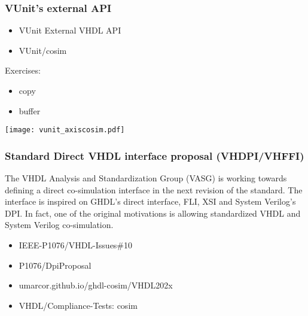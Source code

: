 \documentclass[xcolor={usenames,dvipsnames}]{beamer}
\begin{document}
\begin{frame}
  \frametitle{VUnit's external API}
  \begin{itemize}
  \item VUnit External VHDL API \href{http://vunit.github.io/data_types/user_guide.html\#external-vhdl-api}{\faBook}
  \item VUnit/cosim \href{https://vunit.github.io/cosim}{\faBook}
  \end{itemize}
  \vfill
  \begin{minipage}{.3\linewidth}
  Exercises:
  \begin{itemize}
    \item copy
    \href{https://vunit.github.io/cosim/examples/copy.html}{\faBook}
    \href{https://github.com/VUnit/cosim/tree/master/examples/copy}{\faCode}
    \item buffer
    \href{https://vunit.github.io/cosim/examples/buffer.html}{\faBook}
    \href{https://github.com/VUnit/cosim/tree/master/examples/buffer}{\faCode}
  \end{itemize}
  \end{minipage}
  \begin{minipage}{.65\linewidth}
  \texttt{[image: vunit\_axiscosim.pdf]}
  \end{minipage}
\end{frame}

\begin{frame}
\frametitle{Standard Direct VHDL interface proposal (VHDPI/VHFFI) }

The VHDL Analysis and Standardization Group (VASG) is working towards defining a direct co-simulation interface in the
next revision of the standard.
The interface is inspired on GHDL's direct interface, FLI, XSI and System Verilog's DPI.
In fact, one of the original motivations is allowing standardized VHDL and System Verilog co-simulation.

\vfill

\begin{itemize}
\item IEEE-P1076/VHDL-Issues\#10 \href{https://gitlab.com/IEEE-P1076/VHDL-Issues/-/issues/10}{\faGitlab}
\item P1076/DpiProposal \href{http://www.eda-twiki.org/cgi-bin/view.cgi/P1076/DpiProposal}{\faGlobe}
\item umarcor.github.io/ghdl-cosim/VHDL202x \href{https://umarcor.github.io/ghdl-cosim/vhdl202x/}{\faGlobe}
\item VHDL/Compliance-Tests: cosim \href{https://github.com/VHDL/Compliance-Tests/tree/master/cosim}{\faCode}
\end{itemize}
\end{frame}
\end{document}
